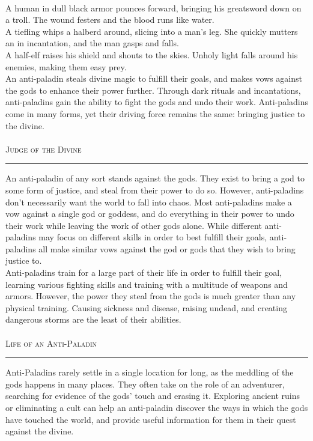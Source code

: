 \documentclass[22pt,a4paper]{article}
\newcommand{\HRule}[2]{\par
  \vspace*{\dimexpr-\parskip-\baselineskip+#2}
  \begingroup
  	\color{sepcol}
  	\noindent\rule{\linewidth}{#1}\par
  \endgroup  
  \vspace*{\dimexpr-\parskip-.5\baselineskip+#2}}
\begin{document}
\begin{multicols}{2}
\\
A human in dull black armor pounces forward, bringing his greatsword down on a troll. The wound festers and the blood runs like water.\\
\indent A tiefling whips a halberd around, slicing into a man’s leg. She quickly mutters an in incantation, and the man gasps and falls. \\
\indent A half-elf raises his shield and shouts to the skies. Unholy light falls around his enemies, making them easy prey.\\
\indent An anti-paladin steals divine magic to fulfill their goals, and makes vows against the gods to enhance their power further. Through dark rituals and incantations, anti-paladins gain the ability to fight the gods and undo their work. Anti-paladins come in many forms, yet their driving force remains the same: bringing justice to the divine.\\
\\
{\fontsize{18pt}{18pt}\textcolor{title}{\textsc{Judge of the Divine}}}
\HRule{1pt}{8pt}
An anti-paladin of any sort stands against the gods. They exist to bring a god to some form of justice, and steal from their power to do so. However, anti-paladins don’t necessarily want the world to fall into chaos. Most anti-paladins make a vow against a single god or goddess, and do everything in their power to undo their work while leaving the work of other gods alone. While different anti-paladins may focus on different skills in order to best fulfill their goals, anti-paladins all make similar vows against the god or gods that they wish to bring justice to.\\
\indent Anti-paladins train for a large part of their life in order to fulfill their goal, learning various fighting skills and training with a multitude of weapons and armors. However, the power they steal from the gods is much greater than any physical training. Causing sickness and disease, raising undead, and creating dangerous storms are the least of their abilities.\\
\\
{\fontsize{18pt}{18pt}\textcolor{title}{\textsc{Life of an Anti-Paladin}}}
\HRule{1pt}{8pt}
Anti-Paladins rarely settle in a single location for long, as the meddling of the gods happens in many places. They often take on the role of an adventurer, searching for evidence of the gods’ touch and erasing it. Exploring ancient ruins or eliminating a cult can help an anti-paladin discover the ways in which the gods have touched the world, and provide useful information for them in their quest against the divine.\\
\end{multicols}
\end{document}
